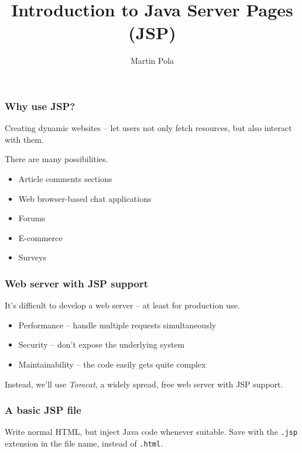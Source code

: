 \documentclass{beamer}
\title{Introduction to Java Server Pages (JSP)}
\author{Martin Pola}
\date{}
\begin{document}
	\maketitle
	
	\frame
	{
		\frametitle{Why use JSP?}

		Creating dynamic websites -- let users not only fetch resources, but also interact with them.

		There are many possibilities.

		\begin{itemize}
			\item Article comments sections
			\item Web browser-based chat applications
			\item Forums
			\item E-commerce
			\item Surveys
		\end{itemize}
	}
	
	\frame
	{
		\frametitle{Web server with JSP support}

		It's difficult to develop a web server -- at least for production use.

		\begin{itemize}
			\item Performance -- handle multiple requests simultaneously
			\item Security -- don't expose the underlying system
			\item Maintainability -- the code easily gets quite complex
		\end{itemize}

		\pause

		Instead, we'll use \emph{Tomcat}, a widely spread, free web server with JSP support.
	}
	
	\frame
	{
		\frametitle{A basic JSP file}

		Write normal HTML, but inject Java code whenever suitable. Save with the \texttt{.jsp} extension in the file name, instead of \texttt{.html}.

		
	}
\end{document}
